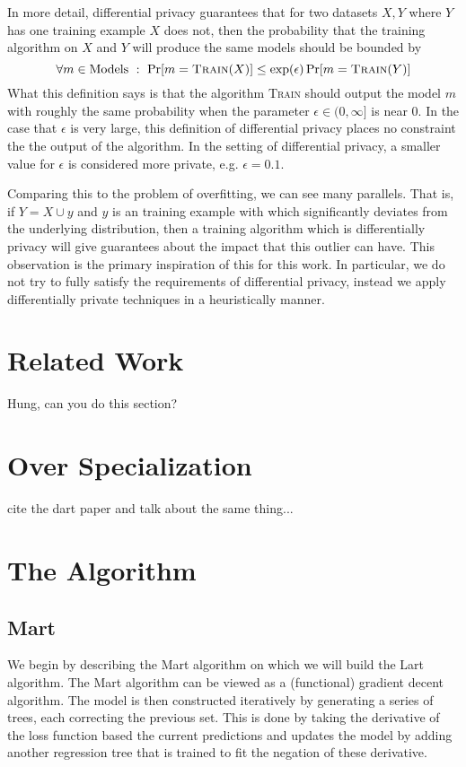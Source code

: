\documentclass{article} %
\begin{document}
In more detail, differential privacy guarantees that for two datasets $X,Y$ where $Y$ has one training example $X$ does not, then the probability that the training algorithm on $X$ and $Y$ will produce the same models should be bounded by
$$
	\forall m \in\mbox{Models} \ : \ \Pr[m = \textsc{Train}(X)] \leq \exp(\epsilon) \Pr[m= \textsc{Train}(Y)]
$$
What this definition says is that the algorithm \textsc{Train} should output the model $m$ with roughly the same probability when the parameter $\epsilon\in (0,\infty]$ is near $0$. In the case that $\epsilon$ is very large, this definition of differential privacy places no constraint the the output of the algorithm. In the setting of differential privacy, a smaller value for $\epsilon$ is considered more private, e.g. $\epsilon=0.1$. 

Comparing this to the problem of overfitting, we can see many parallels. That is, if $Y = X \cup {y}$ and $y$ is an training example with which significantly deviates from the underlying distribution, then a training algorithm which is differentially privacy will give guarantees about the impact that this outlier can have. This observation is the primary inspiration of this for this work. In particular, we do not try to fully satisfy the requirements of differential privacy, instead we apply differentially private techniques in a heuristically manner.

\section{Related Work}    
 
Hung, can you do this section?

\section{Over Specialization}

cite the dart paper and talk about the same thing...

\section{The Algorithm}

\subsection{Mart}
We begin by describing the Mart\cite{mart} algorithm on which we will build the Lart algorithm. The Mart algorithm can be viewed as a (functional) gradient decent algorithm. The model is then constructed iteratively by generating a series of trees, each correcting the previous set. This is done by taking the derivative of the loss function based the current predictions and updates the model by adding another regression tree that is trained to fit the negation of these derivative. 
\end{document}
